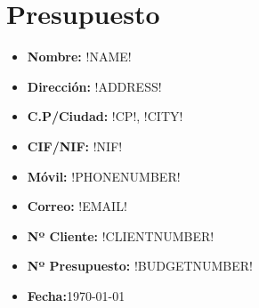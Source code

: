 \chapter{Presupuesto}
\AddToShipoutPicture{\BackgroundPic}
  \begin{minipage}{\linewidth}
      \begin{minipage}{0.475\linewidth}
\begin{caja}[frametitle=Datos del cliente,userdefinedwidth=8cm]
	\begin{itemize}
		\item \textbf{Nombre: }!NAME!
		\item \textbf{Dirección: }!ADDRESS!
		\item \textbf{C.P/Ciudad: }!CP!, !CITY!
		\item \textbf{CIF/NIF: }!NIF!
		\item \textbf{Móvil: }!PHONENUMBER!
		\item \textbf{Correo: }!EMAIL!
	\end{itemize}
\end{caja}
      \end{minipage}
      \hspace{0.05\linewidth}
      \begin{minipage}{0.475\linewidth}
\begin{caja}[frametitle=Datos del presupuesto,userdefinedwidth=7cm]
	\begin{itemize}
		\item \textbf{Nº Cliente: }!CLIENTNUMBER!
		\item \textbf{Nº Presupuesto: }!BUDGETNUMBER!
		\item \textbf{Fecha:}\today
	\end{itemize}
\end{caja}
      \end{minipage}
  \end{minipage}

